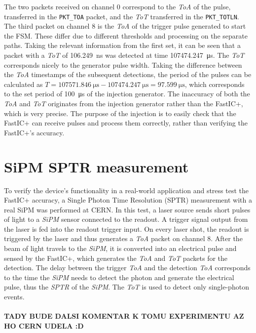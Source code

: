 The two packets received on channel 0 correspond to the \emph{ToA} of the pulse, transferred in the \verb|PKT_TOA| packet, and the \emph{ToT} transferred in the \verb|PKT_TOTLN|. The third packet on channel 8 is the \emph{ToA} of the trigger pulse generated to start the FSM. These differ due to different thresholds and processing on the separate paths. Taking the relevant information from the first set, it can be seen that a packet with a \emph{ToT} of \SI{106.249}{\nano\second} was detected at time \SI{107474.247}{\micro\second}. The \emph{ToT} corresponds nicely to the generator pulse width. Taking the difference between the \emph{ToA} timestamps of the subsequent detections, the period of the pulses can be calculated as $T = \SI{107571.846}{\micro\second} - \SI{107474.247}{\micro\second} = \SI{97.599}{\micro\second}$, which corresponds to the set period of \SI{100}{\micro\second} of the injection generator. The inaccuracy of both the \emph{ToA} and \emph{ToT} originates from the injection generator rather than the FastIC+, which is very precise. The purpose of the injection is to easily check that the FastIC+ can receive pulses and process them correctly, rather than verifying the FastIC+'s accuracy. 


\section{SiPM SPTR measurement}
To verify the device's functionality in a real-world application and stress test the FastIC+ accuracy, a Single Photon Time Resolution (SPTR) measurement with a real SiPM was performed at CERN. In this test, a laser source sends short pulses of light to a \emph{SiPM} sensor connected to the readout. A trigger signal output from the laser is fed into the readout trigger input. On every laser shot, the readout is triggered by the laser and thus generates a \emph{ToA} packet on channel 8. After the beam of light travels to the \emph{SiPM}, it is converted into an electrical pulse and sensed by the FastIC+, which generates the \emph{ToA} and \emph{ToT} packets for the detection. The delay between the trigger \emph{ToA} and the detection \emph{ToA} corresponds to the time the \emph{SiPM} needs to detect the photon and generate the electrical pulse, thus the \emph{SPTR} of the \emph{SiPM}. The \emph{ToT} is used to detect only single-photon events. 
\\
\\
\large \textbf{TADY BUDE DALSI KOMENTAR K TOMU EXPERIMENTU AZ HO CERN UDELA :D}
